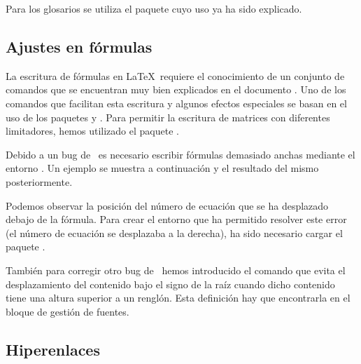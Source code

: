 Para los glosarios se utiliza el paquete  cuyo uso ya ha sido explicado.

\subsection{Ajustes en fórmulas}
La escritura de fórmulas en \LaTeX\ requiere el conocimiento de un conjunto de comandos que se encuentran muy bien explicados en el documento . Uno de los comandos que facilitan esta escritura y algunos efectos especiales se basan en el uso de los paquetes  y . Para permitir la escritura de matrices con diferentes limitadores, hemos utilizado el paquete .

Debido a un bug de  \LuaLaTeX\ es necesario escribir fórmulas demasiado anchas mediante el entorno . Un ejemplo se muestra a continuación y el resultado del mismo posteriormente.

Podemos observar la posición del número de ecuación que se ha desplazado debajo de la fórmula. Para crear el entorno que ha permitido resolver este error (el número de ecuación se desplazaba a la derecha), ha sido necesario cargar el paquete .

También para corregir otro bug de \LuaLaTeX\ hemos introducido el comando  que evita el desplazamiento del contenido bajo el signo de la raíz cuando dicho contenido tiene una altura superior a un renglón. Esta definición hay que encontrarla en el bloque de gestión de fuentes.

\subsection{Hiperenlaces}

